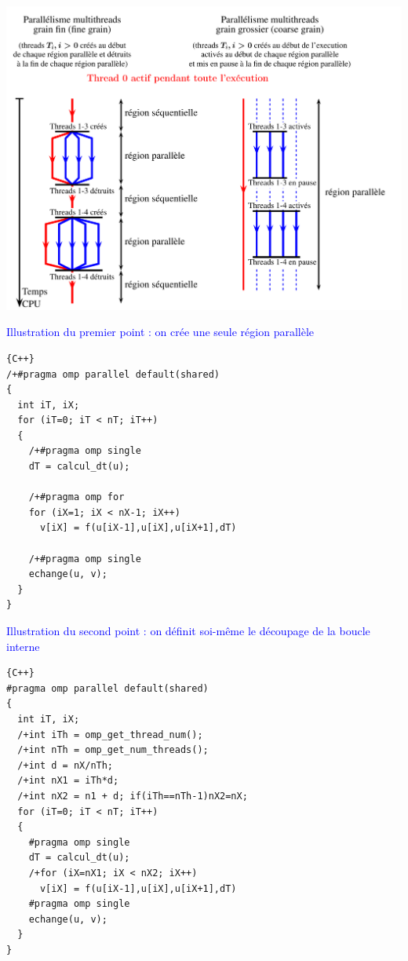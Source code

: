 \documentclass{beamer}
\begin{document}
\begin{frame}
	\includegraphics[scale=0.40]{../../Images/enchainement_coarse}
\end{frame}

\begin{frame}[fragile]
	\textcolor{blue}{Illustration du premier point : on crée une seule région parallèle}
	
	
	\begin{lstlisting}{C++}
/+#pragma omp parallel default(shared)
{
  int iT, iX;
  for (iT=0; iT < nT; iT++)
  {
    /+#pragma omp single
    dT = calcul_dt(u);
    
    /+#pragma omp for
    for (iX=1; iX < nX-1; iX++)
      v[iX] = f(u[iX-1],u[iX],u[iX+1],dT)

    /+#pragma omp single
    echange(u, v);
  }
}
\end{lstlisting}
	
\vfill
\end{frame}

\begin{frame}[fragile]
	\textcolor{blue}{Illustration du second point : on définit soi-même le découpage de la boucle interne}
	
	
	\begin{lstlisting}{C++}
#pragma omp parallel default(shared)
{
  int iT, iX;
  /+int iTh = omp_get_thread_num();
  /+int nTh = omp_get_num_threads();
  /+int d = nX/nTh;
  /+int nX1 = iTh*d;
  /+int nX2 = n1 + d; if(iTh==nTh-1)nX2=nX; 
  for (iT=0; iT < nT; iT++)
  {
    #pragma omp single
    dT = calcul_dt(u);
    /+for (iX=nX1; iX < nX2; iX++)
      v[iX] = f(u[iX-1],u[iX],u[iX+1],dT)
    #pragma omp single
    echange(u, v);
  }
}
	\end{lstlisting}
	
	\vfill
\end{frame}
\end{document}
